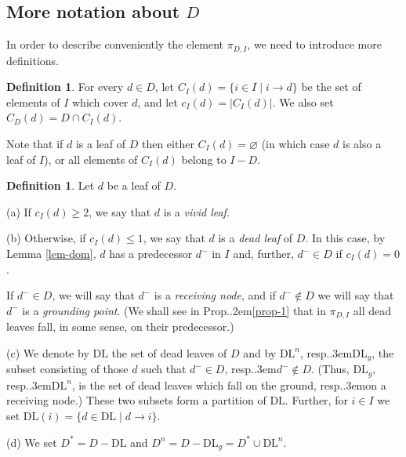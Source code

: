 \documentclass[12pt]{amsart}
\numberwithin{equation}{section}
\theoremstyle{definition}
\newtheorem{defin}[thm]{Definition}
\def\Prop{Prop.\kern.2em}
\def\resp{resp.\kern.3em}
\def\DL{\mathrm{DL}}  %
\begin{document}
\subsection{More notation about $D$} 

In order to describe conveniently the element $\pi_{D,I}$, we need to introduce more definitions. 

\begin{defin} For every $d\in D$, let $C_I(d) =  \{i\in I \mid i \to d\}$ 
be the set of elements of $I$ which cover $d$, and let $c_I(d) = \vert C_I(d)\vert$. We also set $C_D(d) = 
D \cap C_I(d)$. 

Note that if $d$ is a leaf of $D$ then either $C_I(d) = \varnothing$ (in which case $d$ is also a leaf of $I$), or all elements of $C_I(d)$ belong to $I - D$. 
\end{defin} 

\begin{defin} Let $d$ be a leaf of $D$. 

\smallskip (a) If $c_I(d) \geq 2$, we say that $d$ is a \emph{vivid leaf}.  

\smallskip 
(b) Otherwise, if $c_I(d)\leq 1$, we say that $d$ is a \emph{dead leaf} of $D$. In this case, by Lemma \ref{lem-dom}, 
$d$ has a predecessor $d^-$ in $I$ and, further, $d^- \in D$ if $c_I(d) = 0$. 

If $d^- \in D$, we will say that $d^-$ is a \emph{receiving node}, and if $d^-\not\in D$ we will say that 
$d^-$ is a \emph{grounding point}. (We shall see in \Prop \ref{prop-1} that in $\pi_{D, I}$ all dead leaves fall, in some sense, 
on their predecessor.)

\smallskip (c) We denote by $\DL$ the set of dead leaves of $D$ and by $\DL^n$, \resp $\DL_g$,  
the subset consisting of those $d$ such that $d^-\in D$, \resp $d^-\not\in D$. 
(Thus, $\DL_g$, \resp $\DL^n$, is the set of dead leaves which fall on the ground, \resp on a receiving node.) 
These two subsets form a partition of $\DL$.  Further, for $i \in I$ we set 
$\DL(i) = \{d \in \DL \mid d \to i\}$. 

\smallskip (d) We set $D^* = D - \DL$ and $D^n = D - \DL_g = D^* \cup \DL^n$. 
\end{defin} 
\end{document}
